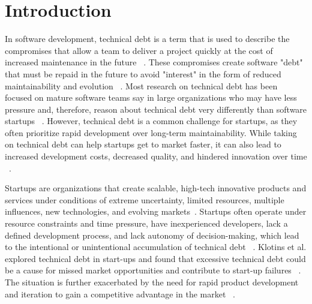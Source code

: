 
\section{Introduction}
In software development, technical debt is a term that is used to describe the compromises that allow a team to deliver a project quickly at the cost of increased maintenance in the future ~\cite{Maldonado7332619}.
These compromises create software "debt" that must be repaid in the future to  avoid "interest" in the form of reduced maintainability and evolution ~\cite{Seaman6225999}.
Most research on technical debt has been focused on mature software teams say in large organizations who may have less pressure and, therefore, reason about technical debt very differently than software startups ~\cite{Besker2018,Li:2015}.
However, technical debt is a common challenge for startups, as they often prioritize rapid development over long-term maintainability.
While taking on technical debt can help startups get to market faster, it can also lead to increased development costs, decreased quality, and hindered innovation over time ~\cite{Seaman6225999, DesignSt86:online}.

Startups are organizations that create scalable, high-tech innovative products and services under conditions of extreme uncertainty, limited resources, multiple influences, new technologies, and evolving markets~\cite{Unterkalmsteiner16,Sutton854066}.
Startups often operate under resource constraints and time pressure, have inexperienced developers, lack a defined development process, and lack autonomy of decision-making, which lead to the intentional or unintentional accumulation of technical debt ~\cite{Besker2018}.
Klotins et al. explored technical debt in start-ups and found that excessive technical debt could be a cause for missed market opportunities and contribute to start-up failures ~\cite{Klotins:2018:ETD}.
The situation is further exacerbated by the need for rapid product development and iteration to gain a competitive advantage in the market ~\cite{Cico0JNM20}.

